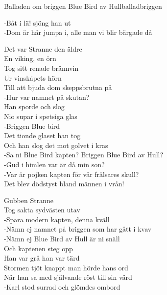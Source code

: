 \begin{song}{Balladen om briggen Blue Bird av Hull}{balladbriggen}
\begin{vers}
-Båt i lä! sjöng han ut\\
-Dom är här jumpa i, alle man vi blir bärgade då\\
\end{vers}
\begin{vers}
Det var Stranne den äldre\\
En viking, en örn\\
Tog sitt renade brännvin\\
Ur vinskåpets hörn\\
Till att bjuda dom skeppsbrutna på\\
-Hur var namnet på skutan?\\
Han sporde och slog\\
Nio supar i spetsiga glas\\
-Briggen Blue bird\\
Det tionde glaset han tog\\
Och han slog det mot golvet i kras\\
-Sa ni Blue Bird kapten? Briggen Blue Bird av Hull?\\
-Gud i himlen var är då min son?\\
-Var är pojken kapten för vår frälsares skull?\\
Det blev dödstyst bland männen i vrån!\\
\end{vers}
\begin{vers}
Gubben Stranne\\
Tog sakta sydvästen utav\\
-Spara modern kapten, denna kväll\\
-Nämn ej namnet på briggen som har gått i kvav\\
-Nämn ej Blue Bird av Hull är ni snäll\\
Och kaptenen steg opp\\
Han var grå han var tärd\\
Stormen tjöt knappt man hörde hans ord\\
När han sa med självande röst till sin värd\\
-Karl stod surrad och glömdes ombord\\
\end{vers}
\end{song}
